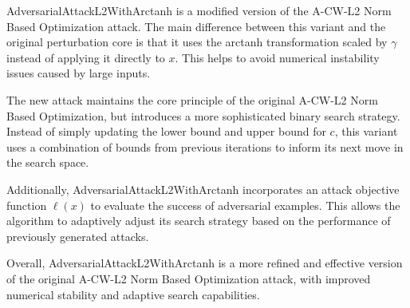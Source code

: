 AdversarialAttackL2WithArctanh is a modified version of the A-CW-L2 Norm Based Optimization attack. The main difference between this variant and the original perturbation core is that it uses the arctanh transformation scaled by $\gamma$ instead of applying it directly to $x$. This helps to avoid numerical instability issues caused by large inputs.

The new attack maintains the core principle of the original A-CW-L2 Norm Based Optimization, but introduces a more sophisticated binary search strategy. Instead of simply updating the lower bound and upper bound for $c$, this variant uses a combination of bounds from previous iterations to inform its next move in the search space.

Additionally, AdversarialAttackL2WithArctanh incorporates an attack objective function $\ell(x)$ to evaluate the success of adversarial examples. This allows the algorithm to adaptively adjust its search strategy based on the performance of previously generated attacks.

Overall, AdversarialAttackL2WithArctanh is a more refined and effective version of the original A-CW-L2 Norm Based Optimization attack, with improved numerical stability and adaptive search capabilities.